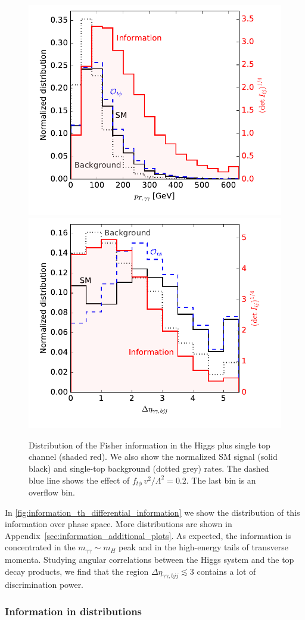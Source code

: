 \begin{figure}
  \includegraphics[height=0.45 \textwidth]{fig/information/th_information_over_ptaa}%
  \includegraphics[height=0.45 \textwidth]{fig/information/th_information_over_deltaeta}%
  \caption{Distribution of the Fisher information in the Higgs plus
    single top channel (shaded red). We also show the normalized SM
    signal (solid black) and single-top background (dotted grey)
    rates. The dashed blue line shows the effect of
    $f_{t \phi} \, v^2 / \Lambda^2 = 0.2$. The last bin is an overflow
    bin.}
  \label{fig:information_th_differential_information}
\end{figure}

In \autoref{fig:information_th_differential_information} we show the distribution
of this information over phase space. More distributions are shown in
Appendix~\ref{sec:information_additional_plots}. As expected, the information is
concentrated in the $m_{\gamma \gamma} \sim m_H$ peak and in the
high-energy tails of transverse momenta. Studying angular correlations
between the Higgs system and the top decay products, we find that the
region $\Delta \eta_{ \gamma \gamma, bjj} \lesssim 3$ contains a lot
of discrimination power.




\subsubsection*{Information in distributions}

